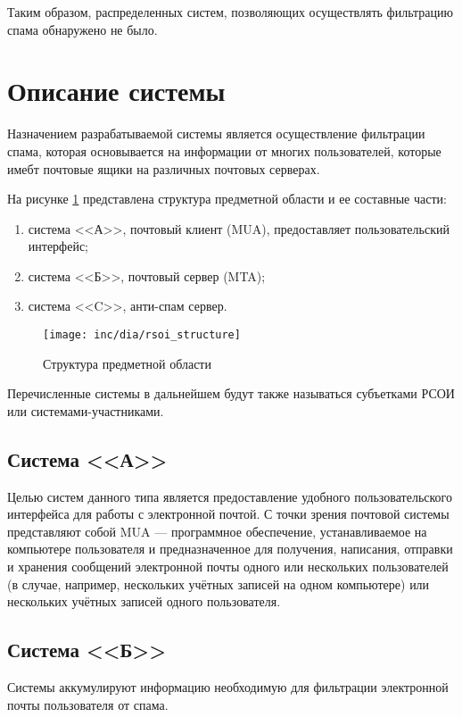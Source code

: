 Таким образом, распределенных систем, позволяющих осуществлять фильтрацию спама обнаружено не было.

\section{Описание системы}
Назначением разрабатываемой системы является осуществление фильтрации спама, которая основывается на информации от многих пользователей, которые имебт почтовые ящики на различных почтовых серверах.

На рисунке \ref{fig:structure} представлена структура предметной области и ее составные части:

\begin{enumerate}
\item{система <<А>>}, почтовый клиент (MUA), предоставляет пользовательский интерфейс;
\item{система <<Б>>}, почтовый сервер (MTA);
\item{система <<C>>}, анти-спам сервер. 
\end{enumerate}


\begin{figure}
  \centering
  \texttt{[image: inc/dia/rsoi\_structure]}
  \caption{Структура предметной области}
  \label{fig:structure}
\end{figure}


Перечисленные системы в дальнейшем будут также называться субъетками РСОИ или системами-участниками.

\subsection{Система <<А>>}
Целью систем данного типа является предоставление удобного пользовательского интерфейса для работы с электронной почтой. С точки зрения почтовой системы представляют собой MUA --- программное обеспечение, устанавливаемое на компьютере пользователя и предназначенное для получения, написания, отправки и хранения сообщений электронной почты одного или нескольких пользователей (в случае, например, нескольких учётных записей на одном компьютере) или нескольких учётных записей одного пользователя. 

\subsection{Система <<Б>>}
Системы аккумулируют информацию необходимую для фильтрации электронной почты пользователя от спама.

